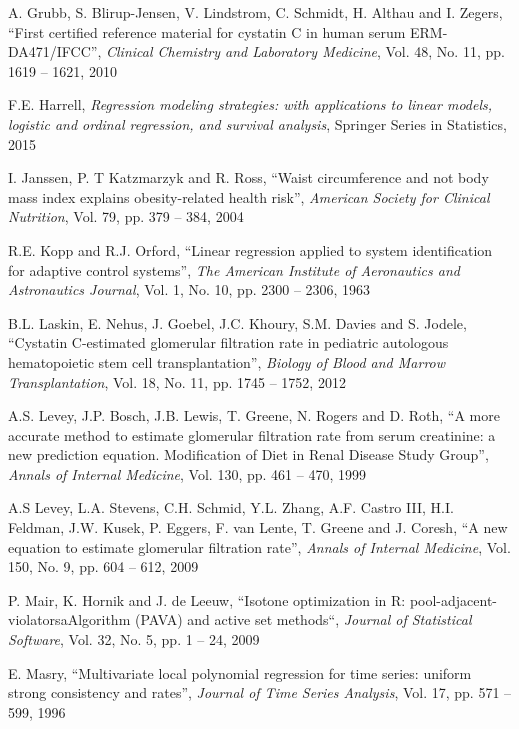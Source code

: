 \documentclass[10pt,final]{siamltex}
\begin{document}
\begin{thebibliography}{99}
   A. Grubb, S. Blirup-Jensen, V. Lindstrom, C. Schmidt, H. Althau and I. Zegers, ``First certified reference material for cystatin C in human serum ERM-DA471/IFCC'', \textit{Clinical Chemistry and Laboratory Medicine}, Vol. 48, No. 11, pp. 1619 -- 1621, 2010

   F.E. Harrell, \textit{Regression modeling strategies: with applications to linear models, logistic and ordinal regression, and survival analysis}, Springer Series in Statistics, 2015

   I. Janssen, P. T Katzmarzyk and R. Ross, ``Waist circumference and not body mass index explains obesity-related health risk'', \textit{American Society for Clinical Nutrition}, Vol. 79, pp. 379 -- 384, 2004

   R.E. Kopp and R.J. Orford, ``Linear regression applied to system identification for adaptive control systems'', \textit{The American Institute of Aeronautics and Astronautics Journal}, Vol. 1, No. 10, pp. 2300 -- 2306, 1963

   B.L. Laskin, E. Nehus, J. Goebel, J.C. Khoury, S.M. Davies and S. Jodele, ``Cystatin C-estimated glomerular filtration rate in pediatric autologous hematopoietic stem cell transplantation'', \textit{Biology of Blood and Marrow Transplantation}, Vol. 18, No. 11, pp. 1745 -- 1752, 2012

   A.S. Levey, J.P. Bosch, J.B. Lewis, T. Greene, N. Rogers and D. Roth, ``A more accurate method to estimate glomerular filtration rate from serum creatinine: a new prediction equation. Modification of Diet in Renal Disease Study Group'', \textit{Annals of Internal Medicine}, Vol. 130, pp. 461 -- 470, 1999

   A.S Levey, L.A. Stevens, C.H. Schmid, Y.L. Zhang, A.F. Castro III, H.I. Feldman, J.W. Kusek, P. Eggers, F. van Lente, T. Greene and J. Coresh, ``A new equation to estimate glomerular filtration rate'', \textit{Annals of Internal Medicine}, Vol. 150, No. 9, pp. 604 -- 612, 2009

   P. Mair, K. Hornik and J. de Leeuw, ``Isotone optimization in R: pool-adjacent-violatorsaAlgorithm (PAVA) and active set methods``, \textit{Journal of Statistical Software}, Vol. 32, No. 5, pp. 1 -- 24, 2009

   E. Masry, ``Multivariate local polynomial regression for time series: uniform strong consistency and rates'', \textit{Journal of Time Series Analysis}, Vol. 17, pp. 571 -- 599, 1996


\end{thebibliography}
\end{document}
